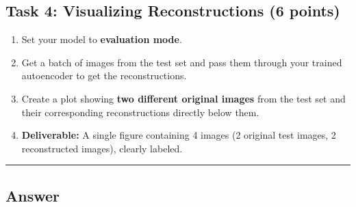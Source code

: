 \documentclass[
  letterpaper,
  DIV=11,
  numbers=noendperiod]{scrartcl}
\providecommand{\tightlist}{%
  \setlength{\itemsep}{0pt}\setlength{\parskip}{0pt}}\usepackage{longtable,booktabs,array}
\begin{document}
\subsection{Task 4: Visualizing Reconstructions (6
points)}\label{task-4-visualizing-reconstructions-6-points}

\begin{enumerate}
\def\labelenumi{\arabic{enumi}.}
\tightlist
\item
  Set your model to \textbf{evaluation mode}.
\item
  Get a batch of images from the test set and pass them through your
  trained autoencoder to get the reconstructions.
\item
  Create a plot showing \textbf{two different original images} from the
  test set and their corresponding reconstructions directly below them.
\item
  \textbf{Deliverable:} A single figure containing 4 images (2 original
  test images, 2 reconstructed images), clearly labeled.
\end{enumerate}

\begin{center}\rule{0.5\linewidth}{0.5pt}\end{center}

\subsection{Answer}\label{answer-6}
\end{document}
